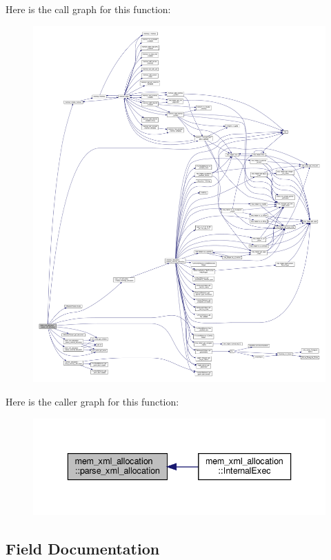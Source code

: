 Here is the call graph for this function\+:
\nopagebreak
\begin{figure}[H]
\begin{center}
\leavevmode
\includegraphics[width=350pt]{d2/d51/classmem__xml__allocation_a693defa1d1e5801b490788f19f4aeddc_cgraph}
\end{center}
\end{figure}
Here is the caller graph for this function\+:
\nopagebreak
\begin{figure}[H]
\begin{center}
\leavevmode
\includegraphics[width=336pt]{d2/d51/classmem__xml__allocation_a693defa1d1e5801b490788f19f4aeddc_icgraph}
\end{center}
\end{figure}


\subsection{Field Documentation}
\mbox{\label{classmem__xml__allocation_adaba8adf5c7edb3c376325bbeb90adf6}} 

